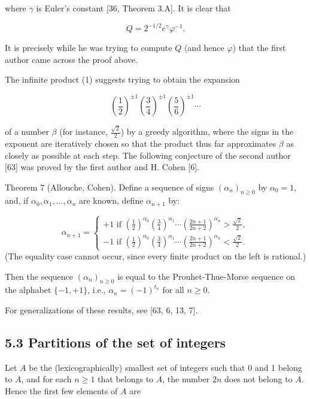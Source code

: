 \documentclass[10pt]{article}
\begin{document}
where $\gamma$ is Euler's constant [36, Theorem 3.A]. It is clear that

\[
Q=2^{-1 / 2} e^{\gamma} \varphi^{-1}.
\]

It is precisely while he was trying to compute $Q$ (and hence $\varphi$) that the first author came across the proof above.

The infinite product (1) suggests trying to obtain the expansion

\[
\left(\frac{1}{2}\right)^{ \pm 1}\left(\frac{3}{4}\right)^{ \pm 1}\left(\frac{5}{6}\right)^{ \pm 1} \cdots
\]

of a number $\beta$ (for instance, $\frac{\sqrt{2}}{2}$) by a greedy algorithm, where the signs in the exponent are iteratively chosen so that the product thus far approximates $\beta$ as closely as possible at each step. The following conjecture of the second author [63] was proved by the first author and H. Cohen [6].

Theorem 7 (Allouche, Cohen). Define a sequence of signs $\left(\alpha_{n}\right)_{n \geq 0}$ by $\alpha_{0}=1$, and, if $\alpha_{0}, \alpha_{1}, \ldots, \alpha_{n}$ are known, define $\alpha_{n+1}$ by:

\[
\alpha_{n+1}=\left\{\begin{array}{l}
+1 \text { if }\left(\frac{1}{2}\right)^{\alpha_{0}}\left(\frac{3}{4}\right)^{\alpha_{1}} \cdots\left(\frac{2 n+1}{2 n+2}\right)^{\alpha_{n}}>\frac{\sqrt{2}}{2}, \\
-1 \text { if }\left(\frac{1}{2}\right)^{\alpha_{0}}\left(\frac{3}{4}\right)^{\alpha_{1}} \cdots\left(\frac{2 n+1}{2 n+2}\right)^{\alpha_{n}}<\frac{\sqrt{2}}{2}.
\end{array}\right.
\]
(The equality case cannot occur, since every finite product on the left is rational.)

Then the sequence $\left(\alpha_{n}\right)_{n \geq 0}$ is equal to the Prouhet-Thue-Morse sequence on the alphabet $\{-1,+1\}$, i.e., $\alpha_{n}=(-1)^{t_{n}}$ for all $n \geq 0$.

For generalizations of these results, see [63, 6, 13, 7].

\subsection*{5.3 Partitions of the set of integers}
Let $A$ be the (lexicographically) smallest set of integers such that 0 and 1 belong to $A$, and for each $n \geq 1$ that belongs to $A$, the number $2 n$ does not belong to $A$. Hence the first few elements of $A$ are
\end{document}
